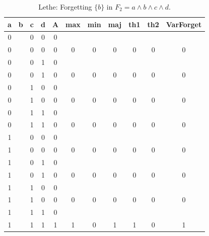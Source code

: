 \begin{table}[!tb]
    \centering
    \begin{tabular}{|c|c|c|c|c|c|c|c|c|c|c|}
        \hline
        \textbf{a} & \textbf{b} & \textbf{c} & \textbf{d} & \textbf{A} & \textbf{max} & \textbf{min} & \textbf{maj} & \textbf{th1} & \textbf{th2} & \textbf{VarForget} \\ \hline
        \rowcolor{gray!40} 0 &  & 0 & 0 & 0 &  &  &  &  &  &  \\ \hline
        \rowcolor{gray!40} 0 &  & 0 & 0 & 0 & 0 & 0 & 0 & 0 & 0 & 0 \\ \hline
        \rowcolor{blue!40} 0 &  & 0 & 1 & 0 &  &  &  &  &  &  \\ \hline
        \rowcolor{blue!40} 0 &  & 0 & 1 & 0 & 0 & 0 & 0 & 0 & 0 & 0 \\ \hline
        \rowcolor{red!40} 0 &  & 1 & 0 & 0 &  &  &  &  &  &  \\ \hline
        \rowcolor{red!40} 0 &  & 1 & 0 & 0 & 0 & 0 & 0 & 0 & 0 & 0 \\ \hline
        \rowcolor{green!40} 0 &  & 1 & 1 & 0 &  &  &  &  &  &  \\ \hline
        \rowcolor{green!40} 0 &  & 1 & 1 & 0 & 0 & 0 & 0 & 0 & 0 & 0 \\ \hline
        \rowcolor{yellow!40} 1 &  & 0 & 0 & 0 &  &  &  &  &  &  \\ \hline
        \rowcolor{yellow!40} 1 &  & 0 & 0 & 0 & 0 & 0 & 0 & 0 & 0 & 0 \\ \hline
        \rowcolor{gray!40} 1 &  & 0 & 1 & 0 &  &  &  &  &  &  \\ \hline
        \rowcolor{gray!40} 1 &  & 0 & 1 & 0 & 0 & 0 & 0 & 0 & 0 & 0 \\ \hline
        \rowcolor{blue!40} 1 &  & 1 & 0 & 0 &  &  &  &  &  &  \\ \hline
        \rowcolor{blue!40} 1 &  & 1 & 0 & 0 & 0 & 0 & 0 & 0 & 0 & 0 \\ \hline
        \rowcolor{red!40} 1 &  & 1 & 1 & 0 &  &  &  &  &  &  \\ \hline
        \rowcolor{red!40} 1 &  & 1 & 1 & 1 & 1 & 0 & 1 & 1 & 0 & 1 \\ \hline
    \end{tabular}
    \caption{Lethe: Forgetting $\{b\}$ in $F_{2} = a \land b \land c \land d$.}
    \label{tab:lethe-F2-b}
\end{table}

